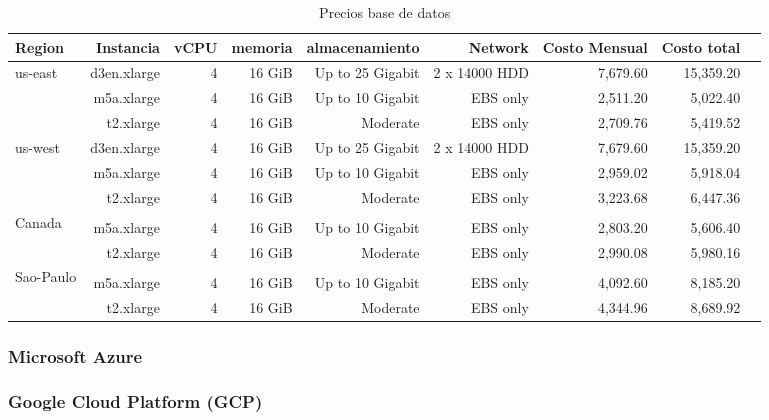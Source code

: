 \documentclass{article}
\begin{document}
\begin{table}[!htp]\centering
\caption{Precios base de datos}\label{tab: }
\scriptsize
\begin{tabular}{lrrrrrrrr}\toprule
Region &Instancia &vCPU &memoria &almacenamiento &Network &Costo Mensual &Costo total \\\midrule
\multirow{3}{*}{us-east} &d3en.xlarge &4 &16 GiB &Up to 25 Gigabit &2 x 14000 HDD &7,679.60 &15,359.20 \\
&m5a.xlarge &4 &16 GiB &Up to 10 Gigabit &EBS only &2,511.20 &5,022.40 \\
&t2.xlarge &4 &16 GiB &Moderate &EBS only &2,709.76 &5,419.52 \\
  \midrule
\multirow{3}{*}{us-west} &d3en.xlarge &4 &16 GiB &Up to 25 Gigabit &2 x 14000 HDD &7,679.60 &15,359.20 \\
&m5a.xlarge &4 &16 GiB &Up to 10 Gigabit &EBS only &2,959.02 &5,918.04 \\
&t2.xlarge &4 &16 GiB &Moderate &EBS only &3,223.68 &6,447.36 \\
  \midrule
\multirow{3}{*}{Canada} &\cellcolor[HTML]{A8A8A8} &\cellcolor[HTML]{A8A8A8} &\cellcolor[HTML]{A8A8A8} &\cellcolor[HTML]{A8A8A8} &\cellcolor[HTML]{A8A8A8} &\cellcolor[HTML]{A8A8A8} &\cellcolor[HTML]{A8A8A8} \\
&m5a.xlarge &4 &16 GiB &Up to 10 Gigabit &EBS only &2,803.20 &5,606.40 \\
&t2.xlarge &4 &16 GiB &Moderate &EBS only &2,990.08 &5,980.16 \\
  \midrule
\multirow{3}{*}{Sao-Paulo} &\cellcolor[HTML]{A8A8A8} &\cellcolor[HTML]{A8A8A8} &\cellcolor[HTML]{A8A8A8} &\cellcolor[HTML]{A8A8A8} &\cellcolor[HTML]{A8A8A8} &\cellcolor[HTML]{A8A8A8} &\cellcolor[HTML]{A8A8A8} \\
&m5a.xlarge &4 &16 GiB &Up to 10 Gigabit &EBS only &4,092.60 &8,185.20 \\
&t2.xlarge &4 &16 GiB &Moderate &EBS only &4,344.96 &8,689.92 \\
\bottomrule
\end{tabular}
\end{table}

  
  \subsubsection*{Microsoft Azure}
  \subsubsection*{Google Cloud Platform (GCP)}
\end{document}

